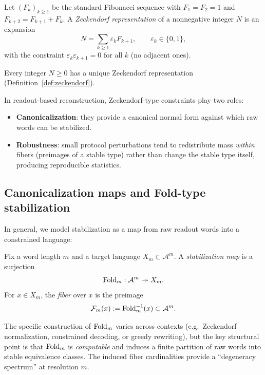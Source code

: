\begin{definition}\label{def:zeckendorf}
Let $(F_k)_{k\ge 1}$ be the standard Fibonacci sequence with $F_1=F_2=1$ and $F_{k+2}=F_{k+1}+F_k$. A \emph{Zeckendorf representation} of a nonnegative integer $N$ is an expansion
\[
N=\sum_{k\ge 1}\varepsilon_k F_{k+1},\qquad \varepsilon_k\in\{0,1\},
\]
with the constraint $\varepsilon_k\varepsilon_{k+1}=0$ for all $k$ (no adjacent ones).
\end{definition}

\begin{proposition}\label{prop:zeckendorf}
Every integer $N\ge 0$ has a unique Zeckendorf representation (Definition~\ref{def:zeckendorf}).
\cite{Lothaire2002}
\end{proposition}

In readout-based reconstruction, Zeckendorf-type constraints play two roles:
\begin{itemize}[leftmargin=*,itemsep=2pt]
  \item \textbf{Canonicalization}: they provide a canonical normal form against which raw words can be stabilized.
  \item \textbf{Robustness}: small protocol perturbations tend to redistribute mass \emph{within} fibers (preimages of a stable type) rather than change the stable type itself, producing reproducible statistics.
\end{itemize}

\subsection{Canonicalization maps and Fold-type stabilization}\label{sec:stabilization:fold}

In general, we model stabilization as a map from raw readout words into a constrained language:

\begin{definition}\label{def:fold}
Fix a word length $m$ and a target language $X_m\subset \mathcal{A}^m$. A \emph{stabilization map} is a surjection
\[
\mathrm{Fold}_m : \mathcal{A}^m \twoheadrightarrow X_m.
\]
For $x\in X_m$, the \emph{fiber} over $x$ is the preimage
\[
\mathcal{F}_m(x) := \mathrm{Fold}_m^{-1}(x) \subset \mathcal{A}^m.
\]
\end{definition}

The specific construction of $\mathrm{Fold}_m$ varies across contexts (e.g.\ Zeckendorf normalization, constrained decoding, or greedy rewriting), but the key structural point is that $\mathrm{Fold}_m$ is \emph{computable} and induces a finite partition of raw words into stable equivalence classes. The induced fiber cardinalities provide a ``degeneracy spectrum'' at resolution $m$.

